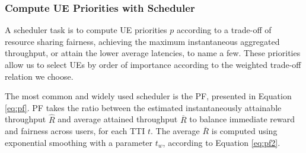 \begin{comment}
    \multicolumn{1}{|c|}{7}  & \multicolumn{1}{c|}{6} & \multicolumn{1}{c|}{466} & 458.72  & 458.72   & 917.44   & 1834.88  & 3669.75  \\ \hline
    \multicolumn{1}{|c|}{8}  & \multicolumn{1}{c|}{6} & \multicolumn{1}{c|}{567} & 558.14  & 558.14   & 1116.28  & 2232.56  & 4465.13  \\ \hline
    \multicolumn{1}{|c|}{9}  & \multicolumn{1}{c|}{6} & \multicolumn{1}{c|}{666} & 655.59  & 655.59   & 1311.19  & 2622.38  & 5244.75  \\ \hline
    \multicolumn{1}{|c|}{10} & \multicolumn{1}{c|}{6} & \multicolumn{1}{c|}{772} & 759.94  & 759.94   & 1519.88  & 3039.75  & 6079.50  \\ \hline
    \multicolumn{1}{|c|}{11} & \multicolumn{1}{c|}{6} & \multicolumn{1}{c|}{873} & 859.36  & 859.36   & 1718.72  & 3437.44  & 6874.88  \\ \hline
    \multicolumn{1}{|c|}{12} & \multicolumn{1}{c|}{8} & \multicolumn{1}{c|}{711} & 933.19  & 933.19   & 1866.38  & 3732.75  & 7465.50  \\ \hline
    \multicolumn{1}{|c|}{13} & \multicolumn{1}{c|}{8} & \multicolumn{1}{c|}{797} & 1046.06 & 1046.06  & 2092.13  & 4184.25  & 8368.50  \\ \hline
    \multicolumn{1}{|c|}{14} & \multicolumn{1}{c|}{8} & \multicolumn{1}{c|}{885} & 1161.56 & 1161.56  & 2323.13  & 4646.25  & 9292.50  \\ \hline
    \multicolumn{1}{|c|}{15} & \multicolumn{1}{c|}{8} & \multicolumn{1}{c|}{948} & 1244.25 & 1244.25  & 2488.50  & 4977.00  & 9954.00  \\ \hline
    \end{tabular}
\end{table}
\end{comment}

\subsubsection*{Compute UE Priorities with Scheduler}

A scheduler task is to compute UE priorities $p$ according to a trade-off of resource sharing fairness, achieving the maximum instantaneous aggregated throughput, or attain the lower average latencies, to name a few. These priorities allow us to select UEs by order of importance according to the weighted trade-off relation we choose. 

The most common and widely used scheduler is the \ac{PF}, presented in Equation \eqref{eq:pf}. \ac{PF} takes the ratio between the estimated instantaneously attainable throughput $\hat{R}$ and average attained throughput $\overline{R}$ to balance immediate reward and fairness across users, for each TTI $t$. The average $\overline{R}$ is computed using exponential smoothing with a parameter $t_w$, according to Equation \eqref{eq:pf2}.

